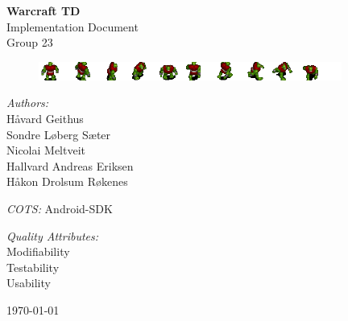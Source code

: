 \begin{titlepage}
\begin{center}

\vspace{10 mm}
{ \huge\bfseries Warcraft TD}\\[0.4cm]
Implementation Document\\
Group 23
\begin{figure}[h]
	\center
	\includegraphics[scale=2]{main/figures/peons}
\end{figure}

\vfill
\begin{minipage}{0.4\textwidth}
\begin{flushleft} \large
\emph{Authors:}\\
Håvard Geithus\\ 
Sondre Løberg Sæter\\ 
Nicolai Meltveit\\
Hallvard Andreas Eriksen\\
Håkon Drolsum Røkenes\\
\end{flushleft}
\end{minipage}
\begin{minipage}{0.4\textwidth}
\begin{flushright} \large
\emph{COTS:} Android-SDK \vspace{5 mm}

\emph{Quality Attributes:} \\

Modifiability\\ Testability\\ Usability
\end{flushright}
\end{minipage}
\vspace{10 mm}

{\large \today}

\end{center}
\end{titlepage}
